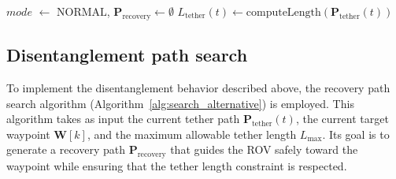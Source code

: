 \begin{algorithm}[t]
\LinesNotNumbered  %
\BlankLine
$mode$ $\gets$ $\mathrm{NORMAL}$, 
$\mathbf{P}_{\text{recovery}} \gets \emptyset$ 
\BlankLine
$L_{\text{tether}}(t) \gets \text{computeLength}(\mathbf{P}_{\mathrm{tether}}(t))$\;

\BlankLine
{}

\BlankLine
{}\;

\caption{Entanglement-aware path planner}
\label{alg:main_loop}
\end{algorithm}





\subsection{Disentanglement path search}


To implement the disentanglement behavior described above, the recovery path search algorithm (Algorithm~\ref{alg:search_alternative}) is employed. This algorithm takes as input the current tether path \(\mathbf{P}_{\mathrm{tether}}(t)\), the current target waypoint \(\mathbf{W}[k]\), and the maximum allowable tether length \(L_{\max}\). Its goal is to generate a recovery path \(\mathbf{P}_{\mathrm{recovery}}\) that guides the \ac{ROV} safely toward the waypoint while ensuring that the tether length constraint is respected.

